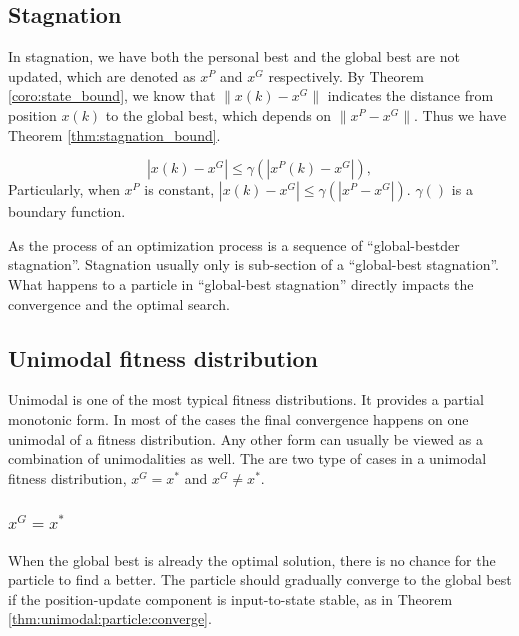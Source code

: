 \subsection{Stagnation}

In stagnation, we have both the personal best and the global best are not updated, which are denoted as $ x^{P} $ and $ x^{G} $ respectively.
By Theorem \ref{coro:state_bound}, we know that $ \lVert x(k) - x^{G} \rVert $ indicates the distance from position $ x(k) $ to the global best, which depends on  $ \lVert x^{P} - x^{G} \rVert $.
Thus we have Theorem \ref{thm:stagnation_bound}.

\begin{mythm}
\label{thm:stagnation_bound}
\begin{equation}
\label{eq:stagnation_bound}
| x(k) - x^{G} | \leq \gamma ( | x^{P}(k) - x^{G} | ), 
\end{equation}
Particularly, when $ x^{P} $ is constant,
$  | x(k) - x^{G} | \leq \gamma ( | x^{P} - x^{G} | ). $
$ \gamma () $ is a boundary function.
\end{mythm}

As the process of an optimization process is a sequence of ``global-bestder stagnation''.
Stagnation usually only is sub-section of a ``global-best stagnation''.
What happens to a particle in ``global-best stagnation'' directly impacts the convergence and the optimal search.

\subsection{Unimodal fitness distribution}

Unimodal is one of the most typical fitness distributions.
It provides a partial monotonic form.
In most of the cases the final convergence happens on one unimodal of a fitness distribution.
Any other form can usually be viewed as a combination of unimodalities as well.
The are two type of cases in a unimodal fitness distribution, $ x^{G} = x^{*} $ and $ x^{G} \not = x^{*} $.

\subsubsection{$ x^{G} = x^{*} $}

When the global best is already the optimal solution, there is no chance for the particle to find a better.
The particle should gradually converge to the global best if the position-update component is input-to-state stable, as in Theorem \ref{thm:unimodal:particle:converge}.

